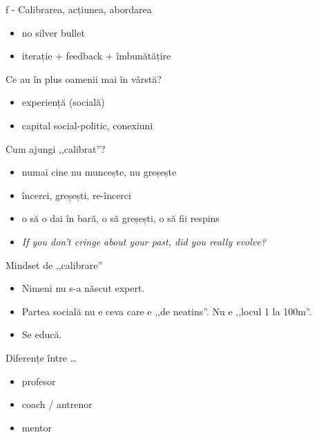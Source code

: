 \documentclass{simple}
\begin{document}
\begin{frame}{f - Calibrarea, acțiunea, abordarea}
  \begin{itemize}
    \pause \item no silver bullet
    \pause \item iterație + feedback + îmbunătățire
  \end{itemize}
\end{frame}

\begin{frame}{Ce au în plus oamenii mai în vârstă?}
  \begin{itemize}
    \pause \item experiență (socială)
    \pause \item capital social-politic, conexiuni
  \end{itemize}
\end{frame}

\begin{frame}{Cum ajungi ,,calibrat''?}
  \begin{itemize}
    \pause \item numai cine nu muncește, nu greșește
    \pause \item încerci, greșești, re-încerci
    \pause \item o să o dai în bară, o să greșești, o să fii respins
    \pause \item \textit{If you don't cringe about your past, did you really evolve?}
  \end{itemize}
\end{frame}

\begin{frame}{Mindset de ,,calibrare''}
  \begin{itemize}
    \pause \item Nimeni nu s-a născut expert.
    \pause \item Partea socială nu e ceva care e ,,de neatins''. Nu e ,,locul 1 la 100m''.
    \pause \item Se educă.
  \end{itemize}
\end{frame}

\begin{frame}{Diferențe între \ldots{}}
  \begin{itemize}
    \pause \item profesor
    \pause \item coach / antrenor
    \pause \item mentor
  \end{itemize}
\end{frame}
\end{document}
